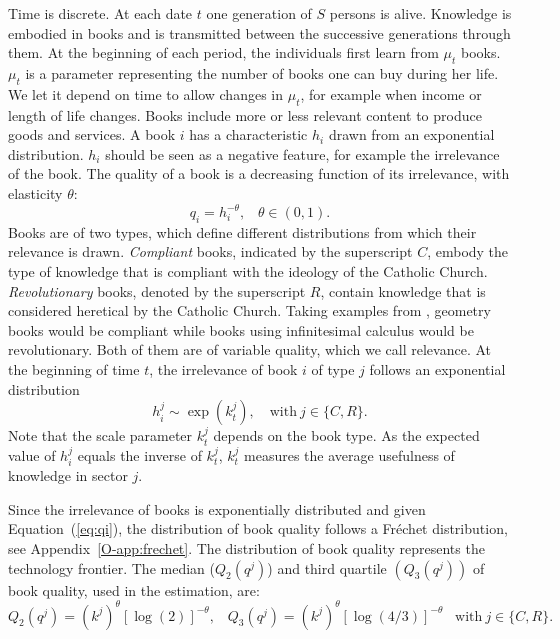 Time is discrete. At each date $t$ one generation of $S$ persons is alive. Knowledge is embodied in books and is transmitted between the successive generations through them. At the beginning of each period, the individuals first learn from $\mu_t$ books. $\mu_t$ is a parameter representing the number of books one can buy during her life. We let it depend on time to allow changes in $\mu_t$, for example when income or length of life changes.  Books include more or less relevant content to produce goods and services. A book  $i$ has a characteristic $h_i$ drawn from an exponential distribution. $h_{i}$ should be seen as a negative feature, for example the irrelevance of the book. The quality of a book is a decreasing function of its irrelevance, with elasticity $\theta$:
\begin{equation}\label{eq:qi}
q_i=h_i^{-\theta}, \;\;\; \theta\in(0,1).
\end{equation}
Books are of two types, which define different distributions from which their relevance is drawn. \textit{Compliant} books, indicated by the superscript ${C}$, embody the type of knowledge that is compliant with the ideology of the Catholic Church.
\textit{Revolutionary} books, denoted by the superscript $R$, contain knowledge that is considered heretical by the Catholic Church. Taking examples from , geometry books would be compliant while books using infinitesimal calculus would be revolutionary. Both of them are of variable quality, which we call relevance. At the beginning of time $t$, the irrelevance of book $i$ of type $j$ follows an exponential distribution
\begin{equation}
h^j_i \sim \exp(k_{t}^j), \quad \text{with} \ j\in \{C,R\}.
\end{equation}
Note that the scale parameter $k_{t}^j$ depends on the book type.
As the expected value of $h^j_i$ equals the inverse of $k^j_{t}$, $k^j_{t}$ measures the average usefulness of knowledge in sector $j$.


Since the irrelevance of books is exponentially distributed and given Equation~(\ref{eq:qi}), the distribution of book quality follows a Fr\'echet distribution, see Appendix~\ref{O-app:frechet}.   The distribution of book quality represents the technology frontier. The median ($Q_2(q^j)$) and third quartile $(Q_3(q^j))$ of book quality, used in the estimation, are:
\begin{equation}
Q_2(q^j) = (k^j)^{\theta} [\log(2)]^{-\theta}, \;\;\; Q_3(q^j)=	(k^j)^{\theta} [\log(4/3)]^{-\theta} \;\;\; \text{with} \ j\in \{C,R\}.
\end{equation}



